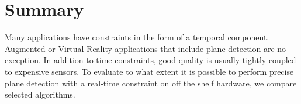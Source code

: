\documentclass[main.tex]{subfiles}
\begin{document}

\section{Summary}
Many applications have constraints in the form of a temporal component. Augmented or Virtual Reality applications that include plane detection
are no exception. In addition to time constraints, good quality is usually tightly coupled to expensive sensors.
To evaluate to what extent it is possible to perform precise plane detection with a real-time constraint on off the shelf hardware,
we compare selected algorithms.
\end{document}
